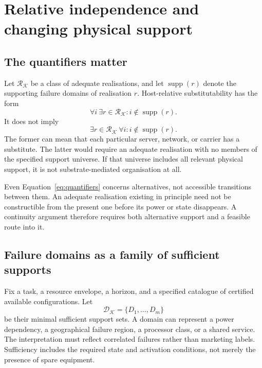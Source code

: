 \documentclass[11pt,a4paper]{article}
\theoremstyle{definition}
\theoremstyle{remark}
\newcommand{\calK}{\mathcal{K}}
\DeclareMathOperator{\supp}{supp}
\begin{document}
\section{Relative independence and changing physical support}\label{sec:independence}
\subsection{The quantifiers matter}
Let $\mathscr R_{\calK}$ be a class of adequate realisations, and let $\supp(r)$ denote the supporting failure domains of realisation $r$. Host-relative substitutability has the form
\begin{equation}\label{eq:quantifiers}
 \forall i\ \exists r\in\mathscr R_{\calK}:i\notin\supp(r).
\end{equation}
It does not imply
\[
 \exists r\in\mathscr R_{\calK}\ \forall i:i\notin\supp(r).
\]
The former can mean that each particular server, network, or carrier has a substitute. The latter would require an adequate realisation with no members of the specified support universe. If that universe includes all relevant physical support, it is not substrate-mediated organisation at all.

Even Equation~\eqref{eq:quantifiers} concerns alternatives, not accessible transitions between them. An adequate realisation existing in principle need not be constructible from the present one before its power or state disappears. A continuity argument therefore requires both alternative support and a feasible route into it.

\subsection{Failure domains as a family of sufficient supports}
Fix a task, a resource envelope, a horizon, and a specified catalogue of certified available configurations. Let
\[
 \mathscr D_{\calK}=\{D_1,\ldots,D_m\}
\]
be their minimal sufficient support sets. A domain can represent a power dependency, a geographical failure region, a processor class, or a shared service. The interpretation must reflect correlated failures rather than marketing labels. Sufficiency includes the required state and activation conditions, not merely the presence of spare equipment.
\end{document}
